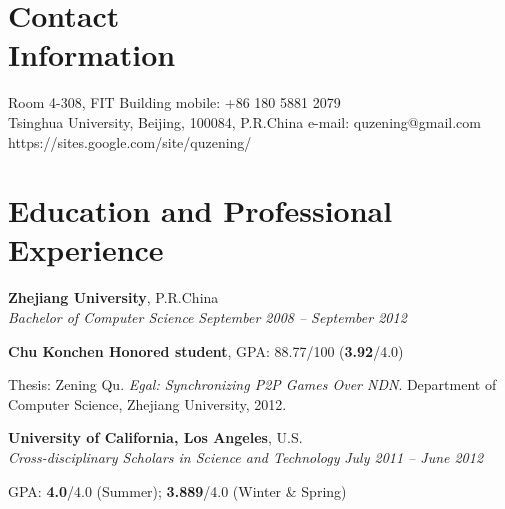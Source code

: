 \documentclass[margin,line]{resume}
\begin{document}
\begin{resume}

    \section{\mysidestyle Contact\\Information}

    Room 4-308, FIT Building                       
    \hfill mobile: +86 180 5881 2079         \vspace{0mm}\\\vspace{0mm}%
    Tsinghua University, Beijing, 100084, P.R.China                         
    \hfill e-mail: quzening@gmail.com          
    \vspace{0mm} \\ \vspace{0mm}
    \hfill 
    https://sites.google.com/site/quzening/

    \section{\mysidestyle Education and Professional Experience}

    \textbf{Zhejiang University}, P.R.China \vspace{2mm}\\\vspace{1mm}%
    \textsl{Bachelor of Computer Science} \hfill \textsl{September 2008 -- September 2012}\vspace{-3mm}\\\vspace{-1mm}%
    \begin{list2}
        \item \textbf{Chu Konchen Honored student}, GPA: 88.77/100 (\textbf{3.92}/4.0)
        \item Thesis: Zening Qu. \textsl{Egal: Synchronizing P2P Games Over NDN}. Department of Computer Science, Zhejiang University, 2012.
    \end{list2}\vspace{-1.5mm}
    
    \textbf{University of California, Los Angeles}, U.S. \vspace{2mm}\\\vspace{1mm}%
    \textsl{Cross-disciplinary Scholars in Science and Technology} \hfill \textsl{July 2011 -- June 2012} \vspace{-3mm}\\\vspace{-1mm}%
    \begin{list2}
        \item GPA: \textbf{4.0}/4.0 (Summer); \textbf{3.889}/4.0 (Winter \& Spring)
    \end{list2}\vspace{-1.5mm}


\end{resume}
\end{document}

